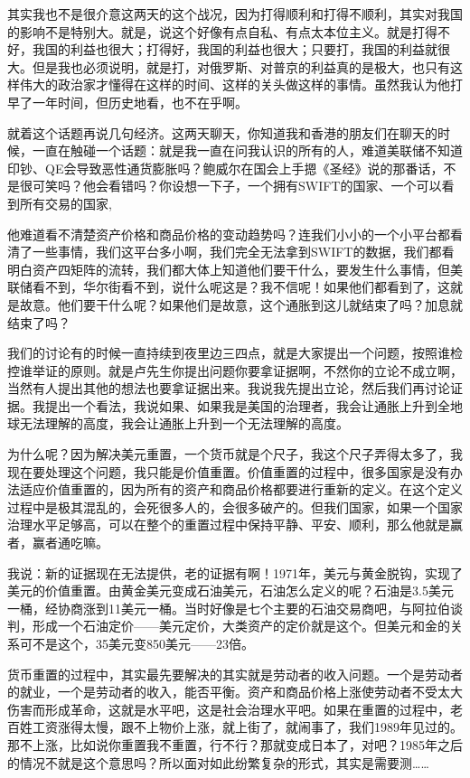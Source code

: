\documentclass[UTF8, 12pt, a4paper]{ctexrep}
\begin{document}
其实我也不是很介意这两天的这个战况，因为打得顺利和打得不顺利，其实对我国的影响不是特别大。就是，说这个好像有点自私、有点太本位主义。就是打得不好，我国的利益也很大；打得好，我国的利益也很大；只要打，我国的利益就很大。但是我也必须说明，就是打，对俄罗斯、对普京的利益真的是极大，也只有这样伟大的政治家才懂得在这样的时间、这样的关头做这样的事情。虽然我认为他打早了一年时间，但历史地看，也不在乎啊。

就着这个话题再说几句经济。这两天聊天，你知道我和香港的朋友们在聊天的时候，一直在触碰一个话题：就是我一直在问我认识的所有的人，难道美联储不知道印钞、QE会导致恶性通货膨胀吗？鲍威尔在国会上手摁《圣经》说的那番话，不是很可笑吗？他会看错吗？你设想一下子，一个拥有SWIFT的国家、一个可以看到所有交易的国家,

他难道看不清楚资产价格和商品价格的变动趋势吗？连我们小小的一个小平台都看清了一些事情，我们这平台多小啊，我们完全无法拿到SWIFT的数据，我们都看明白资产四矩阵的流转，我们都大体上知道他们要干什么，要发生什么事情，但美联储看不到，华尔街看不到，说什么呢这是？我不信呢！如果他们都看到了，这就是故意。他们要干什么呢？如果他们是故意，这个通胀到这儿就结束了吗？加息就结束了吗？

我们的讨论有的时候一直持续到夜里边三四点，就是大家提出一个问题，按照谁检控谁举证的原则。就是卢先生你提出问题你要拿证据啊，不然你的立论不成立啊，当然有人提出其他的想法也要拿证据出来。我说我先提出立论，然后我们再讨论证据。我提出一个看法，我说如果、如果我是美国的治理者，我会让通胀上升到全地球无法理解的高度，我会让通胀上升到一个无法理解的高度。

为什么呢？因为解决美元重置，一个货币就是个尺子，我这个尺子弄得太多了，我现在要处理这个问题，我只能是价值重置。价值重置的过程中，很多国家是没有办法适应价值重置的，因为所有的资产和商品价格都要进行重新的定义。在这个定义过程中是极其混乱的，会死很多人的，会很多破产的。但我们国家，如果一个国家治理水平足够高，可以在整个的重置过程中保持平静、平安、顺利，那么他就是赢者，赢者通吃嘛。

我说：新的证据现在无法提供，老的证据有啊！1971年，美元与黄金脱钩，实现了美元的价值重置。由黄金美元变成石油美元，石油怎么定义的呢？石油是3.5美元一桶，经协商涨到11美元一桶。当时好像是七个主要的石油交易商吧，与阿拉伯谈判，形成一个石油定价——美元定价，大类资产的定价就是这个。但美元和金的关系可不是这个，35美元变850美元——23倍。

货币重置的过程中，其实最先要解决的其实就是劳动者的收入问题。一个是劳动者的就业，一个是劳动者的收入，能否平衡。资产和商品价格上涨使劳动者不受太大伤害而形成革命，这就是水平吧，这是社会治理水平吧。如果在重置的过程中，老百姓工资涨得太慢，跟不上物价上涨，就上街了，就闹事了，我们1989年见过的。那不上涨，比如说你重置我不重置，行不行？那就变成日本了，对吧？1985年之后的情况不就是这个意思吗？所以面对如此纷繁复杂的形式，其实是需要测……
\end{document}

